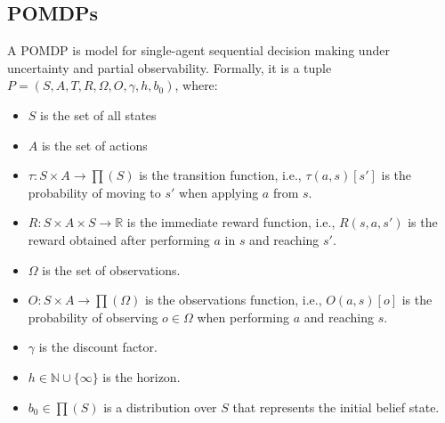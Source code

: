 \documentclass[letterpaper]{article} %
\newcommand{\eliran}[1]{\textbf{[\color{red}ELIRAN:#1]}}
\begin{document}
\subsection{POMDPs}
A POMDP  is model for single-agent sequential decision making under uncertainty and partial observability.
Formally, it is a tuple $P=(S, A, T, R, \Omega, O, \gamma, h, b_0)$, where:
\begin{itemize}
\item
$S$ is the set of all states
\item
$A$ is the set of actions
\item
$\tau:S \times A \rightarrow \prod(S)$  is the transition function, i.e., $\tau(a, s)[s']$ is the probability of moving to $s'$ when applying $a$ from $s$.
\item
$R:S \times A \times S \rightarrow \mathbb{R}$  is the immediate reward function, i.e., $R(s,a, s')$ is the reward obtained after performing $a$ in $s$  and reaching $s'$.
\item
$\Omega$ is the set of observations.
\item
$O:S \times A \rightarrow \prod (\Omega)$  is the observations function, i.e., $O(a,s)[o]$ is the probability of observing $o\in \Omega$ when performing $a$ and reaching $s$.
\item
$\gamma$  is the discount factor.
\item
$h\in\mathbb{N}\cup\{\infty\}$ is the horizon.
\item
$b_0\in \prod(S)$ is a distribution over $S$ that represents the initial belief state.
\end{itemize}
\end{document}
